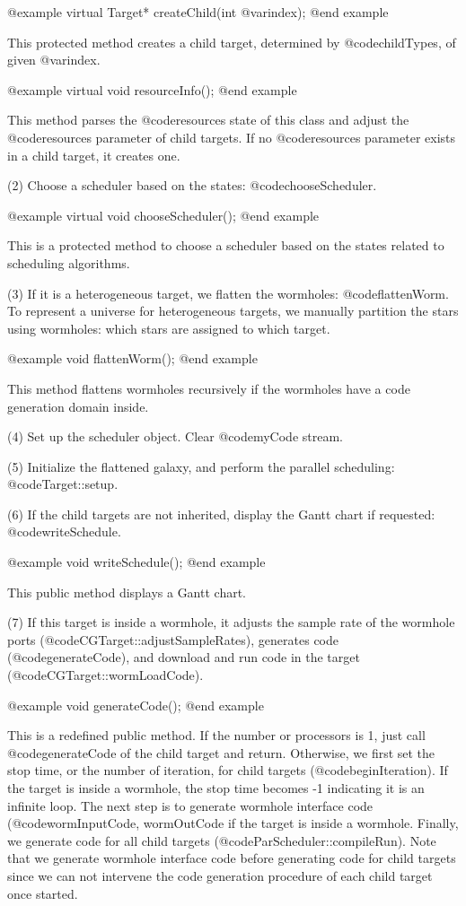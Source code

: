 @example
virtual Target* createChild(int @var{index});
@end example

This protected method creates a child target, determined by
@code{childTypes}, of given @var{index}.

@example
virtual void resourceInfo();
@end example

This method parses the @code{resources} state of this class and adjust the
@code{resources} parameter of child targets. If no @code{resources} parameter
exists in a child target, it creates one.

(2) Choose a scheduler based on the states: @code{chooseScheduler}.

@example
virtual void chooseScheduler();
@end example

This is a protected method to choose a scheduler based on the states
related to scheduling algorithms.

(3) If it is a heterogeneous target, we flatten the wormholes:
@code{flattenWorm}. To represent a universe for heterogeneous targets,
we manually partition the stars using wormholes: which stars are assigned
to which target. 

@example
void flattenWorm();
@end example

This method flattens wormholes recursively if the wormholes have
a code generation domain inside.

(4) Set up the scheduler object. Clear @code{myCode} stream.

(5) Initialize the flattened galaxy, and perform the parallel scheduling:
@code{Target::setup}.

(6) If the child targets are not inherited, display the Gantt chart if
requested: @code{writeSchedule}.

@example
void writeSchedule();
@end example

This public method displays a Gantt chart.

(7) If this target is inside a wormhole, it adjusts the sample rate of the
wormhole ports (@code{CGTarget::adjustSampleRates}), generates code
(@code{generateCode}), and download and run code in the target
(@code{CGTarget::wormLoadCode}).

@example
void generateCode();
@end example

This is a redefined public method.  If the number or processors is 1,
just call @code{generateCode} of the child target and return. 
Otherwise, we first
set the stop time, or the number of iteration, for child targets
(@code{beginIteration}). If the target is inside a wormhole,
the stop time becomes -1 indicating it is an infinite loop.
The next step is to generate wormhole interface code
(@code{wormInputCode, wormOutCode} if the target is inside a wormhole.
Finally, we generate code for all child targets 
(@code{ParScheduler::compileRun}).
Note that we generate wormhole interface code before generating code
for child targets since  we can not intervene the code generation procedure of
each child target once started.

